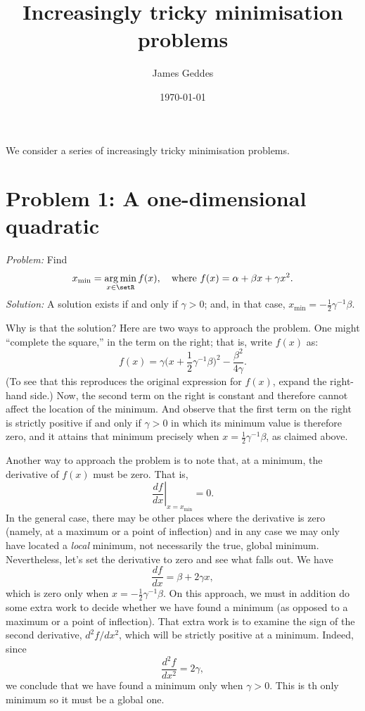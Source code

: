 \documentclass[10pt, a4paper]{article}
\title{Increasingly tricky minimisation problems}
\author{James Geddes}
\date{\today}
\DeclareMathOperator*{\argmin}{arg\,min}
\begin{document}
\maketitle

We consider a series of increasingly tricky minimisation problems. 

\section{Problem 1: A one-dimensional quadratic} \label{sec:one-d-quadratic}
  
\emph{Problem:} Find
\begin{equation}
  x_\text{min} = \argmin_{x\in\setR} f(x), \quad\text{where $f(x) = \alpha + \beta x + \gamma x^2$}.
\label{problem-quadr-one-d}
\end{equation}
\emph{Solution:} A solution exists if and only if $\gamma>0$; and, in
that case, $x_\text{min} = -\frac{1}{2}\gamma^{-1}\beta$.

Why is that the solution? Here are two ways to approach the
problem. One might “complete the square,” in the term on the right;
that is, write $f(x)$ as:
\begin{equation*}
  f(x) = \gamma\bigl(x + \frac{1}{2}\gamma^{-1}\beta\bigr)^2 - \frac{\beta^2}{4\gamma}. 
\end{equation*}
(To see that this reproduces the original expression for $f(x)$,
expand the right-hand side.) Now, the second term on the right is
constant and therefore cannot affect the location of the minimum. And
observe that the first term on the right is strictly positive if and
only if $\gamma>0$ in which its minimum value is therefore zero, and it
attains that minimum precisely when $x = \frac{1}{2}\gamma^{-1}\beta$, as
claimed above.

Another way to approach the problem is to note that, at a minimum, the
derivative of $f(x)$ must be zero. That is,
\begin{equation*}
  \left.\frac{df}{dx}\right|_{x = x_\text{min}} = 0.
\end{equation*}
In the general case, there may be other places where the derivative is
zero (namely, at a maximum or a point of inflection) and in any case
we may only have located a \emph{local} minimum, not necessarily the
true, global minimum. Nevertheless, let's set the derivative to zero
and see what falls out. We have
\begin{equation*}
  \frac{df}{dx} = \beta + 2 \gamma x,
\end{equation*}
which is zero only when $x = -\frac{1}{2}\gamma^{-1}\beta$. On this approach,
we must in addition do some extra work to decide whether we have found
a minimum (as opposed to a maximum or a point of inflection). That
extra work is to examine the sign of the second derivative,
$d^2f/dx^2$, which will be strictly positive at a minimum. Indeed,
since
\begin{equation*}
  \frac{d^2f}{dx^2} = 2\gamma,
 \end{equation*}
we conclude that we have found a minimum only when $\gamma> 0$. This is th
only minimum so it must be a global one.
\end{document}
